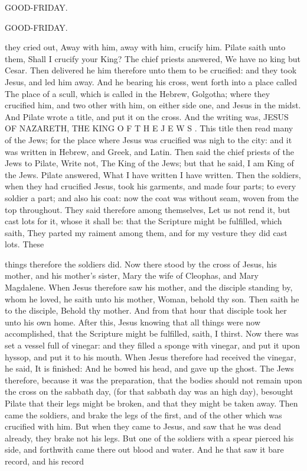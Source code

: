 GOOD-FRIDAY.

GOOD-FRIDAY.

they cried out, Away with him, away with him, crucify him. Pilate saith unto them, Shall I crucify your King? The chief priests answered, We have no king but Cesar. Then delivered he him therefore unto them to be crucified: and they took Jesus, and led him away. And he bearing his cross, went forth into a place called The place of a scull, which is called in the Hebrew, Golgotha; where they crucified him, and two other with him, on either side one, and Jesus in the midst. And Pilate wrote a title, and put it on the cross. And the writing was, JESUS OF NAZARETH, THE KING O F T H E J E W S . This title then read many of the Jews; for the place where Jesus was crucified was nigh to the city: and it was written in Hebrew, and Greek, and Latin. Then said the chief priests of the Jews to Pilate, Write not, The King of the Jews; but that he said, I am King of the Jews. Pilate answered, What I have written I have written. Then the soldiers, when they had crucified Jesus, took his garments, and made four parts; to every soldier a part; and also his coat: now the coat was without seam, woven from the top throughout. They said therefore among themselves, Let us not rend it, but cast lots for it, whose it shall be: that the Scripture might be fulfilled, which saith, They parted my raiment among them, and for my vesture they did cast lots. These

things therefore the soldiers did. Now there stood by the cross of Jesus, his mother, and his mother’s sister, Mary the wife of Cleophas, and Mary Magdalene. When Jesus therefore saw his mother, and the disciple standing by, whom he loved, he saith unto his mother, Woman, behold thy son. Then saith he to the disciple, Behold thy mother. And from that hour that disciple took her unto his own home. After this, Jesus knowing that all things were now accomplished, that the Scripture might be fulfilled, saith, I thirst. Now there was set a vessel full of vinegar: and they filled a sponge with vinegar, and put it upon hyssop, and put it to his mouth. When Jesus therefore had received the vinegar, he said, It is finished: And he bowed his head, and gave up the ghost. The Jews therefore, because it was the preparation, that the bodies should not remain upon the cross on the sabbath day, (for that sabbath day was an high day), besought Pilate that their legs might be broken, and that they might be taken away. Then came the soldiers, and brake the legs of the first, and of the other which was crucified with him. But when they came to Jesus, and saw that he was dead already, they brake not his legs. But one of the soldiers with a spear pierced his side, and forthwith came there out blood and water. And he that saw it bare record, and his record

